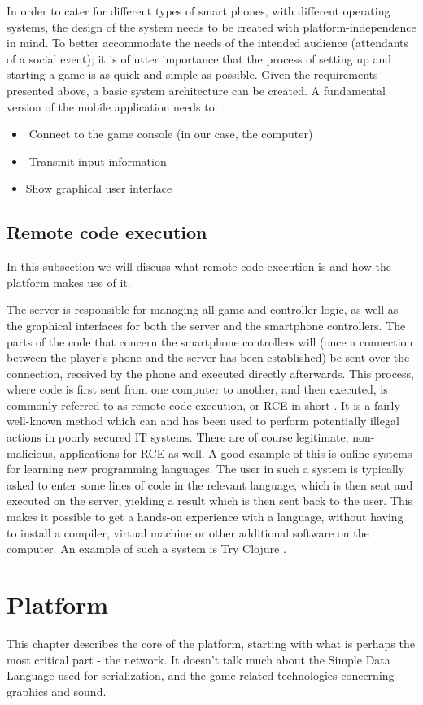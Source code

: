 \documentclass{article}
\begin{document}
In order to cater for different types of smart phones, with different operating systems, the design
of the system needs to be created with platform-independence in mind. To better accommodate
the needs of the intended audience (attendants of a social event); it is of utter importance that the
process of setting up and starting a game is as quick and simple as possible.
Given the requirements presented above, a basic system architecture can be created. A
fundamental version of the mobile application needs to:
\begin{itemize}
\itemConnect to the game console (in our case, the computer)
\itemTransmit input information
\item Show graphical user interface
\end{itemize}

\subsection{Remote code execution}
In this subsection we will discuss what remote code execution is and how the platform makes use
of it. 

The server is responsible for managing all game and controller logic, as well as the graphical
interfaces for both the server and the smartphone controllers. The parts of the code that concern
the smartphone controllers will (once a connection between the player's phone and the server has
been established) be sent over the connection, received by the phone and executed directly
afterwards.
This process, where code is first sent from one computer to another, and then executed, is
commonly referred to as remote code execution, or RCE in short \cite{key:3}. It is a fairly well-known
method which can and has been used to perform potentially illegal actions in poorly secured IT
systems. There are of course legitimate, non-malicious, applications for RCE as well. A good
example of this is online systems for learning new programming languages. The user in such a
system is typically asked to enter some lines of code in the relevant language, which is then sent
and executed on the server, yielding a result which is then sent back to the user. This makes it
possible to get a hands-on experience with a language, without having to install a compiler,
virtual machine or other additional software on the computer. An example of such a system is
Try Clojure \cite{key:4}.


\section{Platform}
This chapter describes the core of the platform, starting with what is perhaps the most critical
part - the network. It doesn't talk much about the Simple Data Language used for serialization, and
 the game related technologies concerning graphics and sound. 
\end{document}
